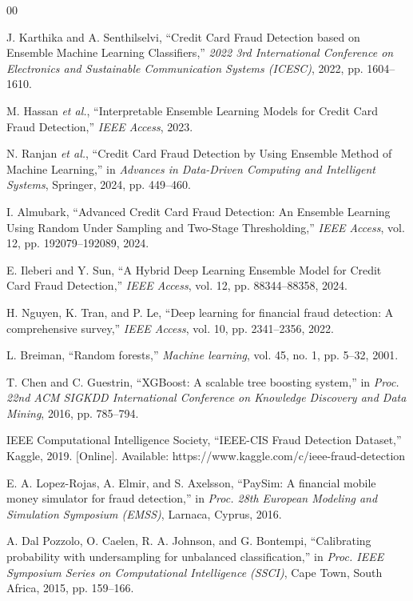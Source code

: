 \documentclass[conference]{IEEEtran}
\begin{document}
\begin{thebibliography}{00}
\footnotesize
\setlength{\itemsep}{0pt}
\setlength{\parskip}{0pt}

J. Karthika and A. Senthilselvi, ``Credit Card Fraud Detection based on Ensemble Machine Learning Classifiers,'' \emph{2022 3rd International Conference on Electronics and Sustainable Communication Systems (ICESC)}, 2022, pp. 1604--1610.

M. Hassan \textit{et al.}, ``Interpretable Ensemble Learning Models for Credit Card Fraud Detection,'' \emph{IEEE Access}, 2023.

N. Ranjan \textit{et al.}, ``Credit Card Fraud Detection by Using Ensemble Method of Machine Learning,'' in \emph{Advances in Data-Driven Computing and Intelligent Systems}, Springer, 2024, pp. 449--460.

I. Almubark, ``Advanced Credit Card Fraud Detection: An Ensemble Learning Using Random Under Sampling and Two-Stage Thresholding,'' \emph{IEEE Access}, vol. 12, pp. 192079--192089, 2024.

E. Ileberi and Y. Sun, ``A Hybrid Deep Learning Ensemble Model for Credit Card Fraud Detection,'' \emph{IEEE Access}, vol. 12, pp. 88344--88358, 2024.

H. Nguyen, K. Tran, and P. Le, ``Deep learning for financial fraud detection: A comprehensive survey,'' \emph{IEEE Access}, vol. 10, pp. 2341--2356, 2022.

L. Breiman, ``Random forests,'' \emph{Machine learning}, vol. 45, no. 1, pp. 5--32, 2001.

T. Chen and C. Guestrin, ``XGBoost: A scalable tree boosting system,'' in \emph{Proc. 22nd ACM SIGKDD International Conference on Knowledge Discovery and Data Mining}, 2016, pp. 785--794.

IEEE Computational Intelligence Society, ``IEEE-CIS Fraud Detection Dataset,'' Kaggle, 2019. [Online]. Available: https://www.kaggle.com/c/ieee-fraud-detection

E. A. Lopez-Rojas, A. Elmir, and S. Axelsson, ``PaySim: A financial mobile money simulator for fraud detection,'' in \textit{Proc. 28th European Modeling and Simulation Symposium (EMSS)}, Larnaca, Cyprus, 2016.

A. Dal Pozzolo, O. Caelen, R. A. Johnson, and G. Bontempi, ``Calibrating probability with undersampling for unbalanced classification,'' in \textit{Proc. IEEE Symposium Series on Computational Intelligence (SSCI)}, Cape Town, South Africa, 2015, pp. 159--166.


\end{thebibliography}
\end{document}
